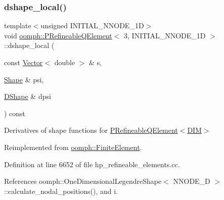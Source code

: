 \subsubsection{\texorpdfstring{dshape\+\_\+local()}{dshape\_local()}}
{\footnotesize\ttfamily template$<$unsigned I\+N\+I\+T\+I\+A\+L\+\_\+\+N\+N\+O\+D\+E\+\_\+1D$>$ \\
void \hyperlink{classoomph_1_1PRefineableQElement}{oomph\+::\+P\+Refineable\+Q\+Element}$<$ 3, I\+N\+I\+T\+I\+A\+L\+\_\+\+N\+N\+O\+D\+E\+\_\+1D $>$\+::dshape\+\_\+local (\begin{DoxyParamCaption}\item[{const \hyperlink{classoomph_1_1Vector}{Vector}$<$ double $>$ \&}]{s,  }\item[{\hyperlink{classoomph_1_1Shape}{Shape} \&}]{psi,  }\item[{\hyperlink{classoomph_1_1DShape}{D\+Shape} \&}]{dpsi }\end{DoxyParamCaption}) const\hspace{0.3cm}{\ttfamily [virtual]}}



Derivatives of shape functions for \hyperlink{classoomph_1_1PRefineableQElement}{P\+Refineable\+Q\+Element$<$\+D\+I\+M$>$} 



Reimplemented from \hyperlink{classoomph_1_1FiniteElement_a9db1456b827131c21a991ac9fedf4b0c}{oomph\+::\+Finite\+Element}.



Definition at line 6652 of file hp\+\_\+refineable\+\_\+elements.\+cc.



References oomph\+::\+One\+Dimensional\+Legendre\+Shape$<$ N\+N\+O\+D\+E\+\_\+D $>$\+::calculate\+\_\+nodal\+\_\+positions(), and i.

\mbox{\label{classoomph_1_1PRefineableQElement_3_013_00_01INITIAL__NNODE__1D_01_4_a502fd0f80738b3e7d185662595fbbb1b}} 
